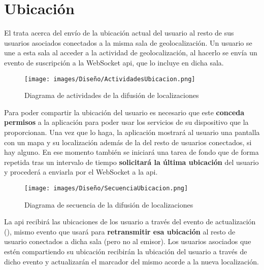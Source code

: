 \section{Ubicación}

El \textbf{} trata acerca del envío de la ubicación actual del usuario al resto de sus usuarios asociados conectados a la misma sala de geolocalización. Un usuario se une a esta sala al acceder a la actividad de geolocalización, al hacerlo se envía un evento de suscripción a la WebSocket \acrshort{api}, que lo incluye en dicha sala.

\begin{figure}[H]
    \centering
    \texttt{[image: images/Diseño/ActividadesUbicacion.png]}
    \caption{Diagrama de actividades de la difusión de localizaciones}
    \label{dia:actividad_ubicacion}
\end{figure}

Para poder compartir la ubicación del usuario es necesario que este \textbf{conceda permisos} a la aplicación para poder usar los servicios de su dispositivo que la proporcionan. Una vez que lo haga, la aplicación mostrará al usuario una pantalla con un mapa y su localización además de la del resto de usuarios conectados, si hay alguno. En ese momento también se iniciará una tarea de fondo que de forma repetida tras un intervalo de tiempo \textbf{solicitará la última ubicación} del usuario y procederá a enviarla por el WebSocket a la \acrshort{api}.

\begin{figure}[H]
    \centering
    \texttt{[image: images/Diseño/SecuenciaUbicacion.png]}
    \caption{Diagrama de secuencia de la difusión de localizaciones}
    \label{dia:secuencia_ubicacion}
\end{figure}

La \acrshort{api} recibirá las ubicaciones de los usuario a través del evento de actualización (), mismo evento que usará para \textbf{retransmitir esa ubicación} al resto de usuario conectados a dicha sala (pero no al emisor). Los usuarios asociados que estén compartiendo su ubicación recibirán la ubicación del usuario a través de dicho evento y actualizarán el marcador del mismo acorde a la nueva localización.